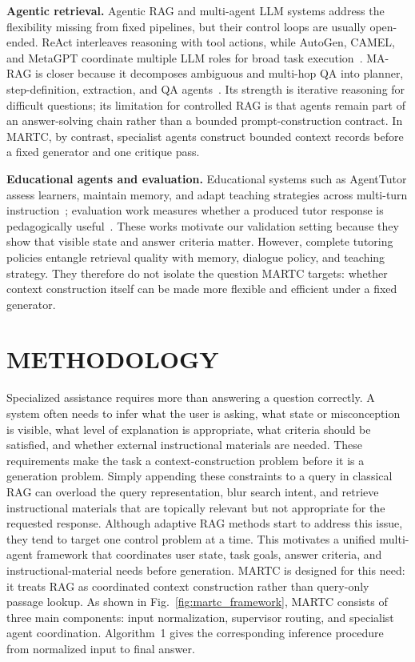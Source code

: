 \documentclass[letterpaper, 10 pt, conference]{ieeeconf}
\begin{document}
\noindent\textbf{Agentic retrieval.} Agentic RAG and multi-agent LLM systems address the flexibility missing from fixed pipelines, but their control loops are usually open-ended. ReAct interleaves reasoning with tool actions, while AutoGen, CAMEL, and MetaGPT coordinate multiple LLM roles for broad task execution~\cite{yao2023react,wu2024autogen,li2023camel,hong2024metagpt}. MA-RAG is closer because it decomposes ambiguous and multi-hop QA into planner, step-definition, extraction, and QA agents~\cite{nguyen2025marag}. Its strength is iterative reasoning for difficult questions; its limitation for controlled RAG is that agents remain part of an answer-solving chain rather than a bounded prompt-construction contract. In MARTC, by contrast, specialist agents construct bounded context records before a fixed generator and one critique pass.

\noindent\textbf{Educational agents and evaluation.} Educational systems such as AgentTutor assess learners, maintain memory, and adapt teaching strategies across multi-turn instruction~\cite{liu2026agenttutor}; evaluation work measures whether a produced tutor response is pedagogically useful~\cite{maurya2025aitutoreval,chevalier2024sciencetutors,xu2025edubench,macina2025mathtutorbench,srinivasa2025tutorbench}. These works motivate our validation setting because they show that visible state and answer criteria matter. However, complete tutoring policies entangle retrieval quality with memory, dialogue policy, and teaching strategy. They therefore do not isolate the question MARTC targets: whether context construction itself can be made more flexible and efficient under a fixed generator.

\section{METHODOLOGY}
\label{sec:methodology}

Specialized assistance requires more than answering a question correctly. A system often needs to infer what the user is asking, what state or misconception is visible, what level of explanation is appropriate, what criteria should be satisfied, and whether external instructional materials are needed. These requirements make the task a context-construction problem before it is a generation problem. Simply appending these constraints to a query in classical RAG can overload the query representation, blur search intent, and retrieve instructional materials that are topically relevant but not appropriate for the requested response. Although adaptive RAG methods start to address this issue, they tend to target one control problem at a time. This motivates a unified multi-agent framework that coordinates user state, task goals, answer criteria, and instructional-material needs before generation. \textsc{MARTC} is designed for this need: it treats RAG as coordinated context construction rather than query-only passage lookup. As shown in Fig.~\ref{fig:martc_framework}, MARTC consists of three main components: input normalization, supervisor routing, and specialist agent coordination. Algorithm~1 gives the corresponding inference procedure from normalized input to final answer.
\end{document}
